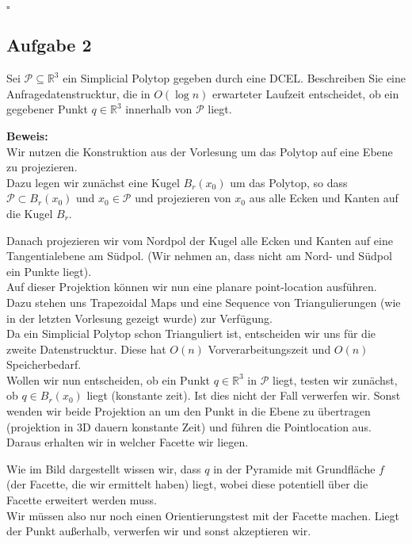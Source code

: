 \documentclass[11pt,a4paper,ngerman]{article}
\begin{document}
\mbox{}\hfill$\square$

\subsection*{Aufgabe 2}


Sei $\mathcal{P} \subseteq \mathbb{R}^3$ ein Simplicial Polytop gegeben durch eine DCEL. Beschreiben Sie eine
Anfragedatenstrucktur, die in $O(\log n)$ erwarteter Laufzeit entscheidet, ob ein gegebener Punkt $q \in \mathbb{R}^3$
innerhalb von $\mathcal{P}$ liegt.\

\textbf{Beweis:}\\

Wir nutzen die Konstruktion aus der Vorlesung um das Polytop auf eine Ebene zu projezieren.\\
Dazu legen wir zunächst eine Kugel $B_r(x_0)$ um das Polytop, so dass $\mathcal{P} \subset B_r(x_0)$ und $x_0 \in \mathcal{P}$
und projezieren von $x_0$ aus alle Ecken und Kanten auf die Kugel $B_r$.

Danach projezieren wir vom Nordpol der Kugel alle Ecken und Kanten auf eine Tangentialebene am Südpol. (Wir nehmen an, dass
nicht am Nord- und Südpol ein Punkte liegt).\\

Auf dieser Projektion können wir nun eine planare point-location ausführen. Dazu stehen uns Trapezoidal Maps und
eine Sequence von Triangulierungen (wie in der letzten Vorlesung gezeigt wurde) zur Verfügung.\\

Da ein Simplicial Polytop schon Trianguliert ist, entscheiden wir uns für die zweite Datenstrucktur. Diese hat
$O(n)$ Vorverarbeitungszeit und $O(n)$ Speicherbedarf.\\

Wollen wir nun entscheiden, ob ein Punkt $q \in \mathbb{R}^3$ in $\mathcal{P}$ liegt, testen wir zunächst, ob $q \in B_r(x_0)$ liegt
(konstante zeit). Ist dies nicht der Fall verwerfen wir. Sonst wenden wir beide Projektion an um den Punkt in die Ebene
zu übertragen (projektion in 3D dauern konstante Zeit) und führen die Pointlocation aus. Daraus erhalten wir in welcher Facette wir liegen.\\

\vspace{5cm}

Wie im Bild dargestellt wissen wir, dass $q$ in der Pyramide mit Grundfläche $f$ (der Facette, die wir ermittelt haben) liegt, wobei
diese potentiell über die Facette erweitert werden muss.\\
Wir müssen also nur noch einen Orientierungstest mit der Facette machen. Liegt der Punkt außerhalb, verwerfen wir und sonst akzeptieren wir.\\
\end{document}
